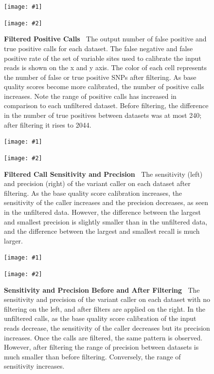 \documentclass{report}
\newcommand{\titlecaption}[2]{\caption[#1]{\textbf{#1 \textbar\,} #2}}
\newcommand{\includetwo}[2]{\begin{minipage}{.475\textwidth}%
\texttt{[image: \#1]}%
\end{minipage}\hfill\begin{minipage}{.475\textwidth}%
\texttt{[image: \#2]}%
\end{minipage}}
\begin{document}
\begin{figure}
\centering
\includetwo{flt_fp_heatmap.pdf}{flt_tp_heatmap.pdf}
\titlecaption{Filtered Positive Calls}{The output number of false positive and true positive calls for each dataset. The false negative and false positive rate of the set of variable sites used to calibrate the input reads is shown on the x and y axis. The color of each cell represents the number of false or true positive SNPs after filtering. As base quality scores become more calibrated, the number of positive calls increases. Note the range of positive calls has increased in comparison to each unfiltered dataset. Before filtering, the difference in the number of true positives between datasets was at most 240; after filtering it rises to 2044.}
\label{fig:vc_flt_p}
\end{figure}


\begin{figure}
\centering
\includetwo{flt_sensitivity.pdf}{flt_precision.pdf}
\titlecaption{Filtered Call Sensitivity and Precision}{The sensitivity (left) and precision (right) of the variant caller on each dataset after filtering. As the base quality score calibration increases, the sensitivity of the caller increases and the precision decreases, as seen in the unfiltered data. However, the difference between the largest and smallest precision is slightly smaller than in the unfiltered data, and the difference between the largest and smallest recall is much larger.}
\label{fig:vc_flt_sp}
\end{figure}

\begin{figure}
\centering
\includetwo{sens_precision.pdf}{flt_sens_precision.pdf}
\titlecaption{Sensitivity and Precision Before and After Filtering}{The sensitivity and precision of the variant caller on each dataset with no filtering on the left, and after filters are applied on the right. In the unfiltered calls, as the base quality score calibration of the input reads decrease, the sensitivity of the caller decreases but its precision increases. Once the calls are filtered, the same pattern is observed. However, after filtering the range of precision between datasets is much smaller than before filtering. Conversely, the range of sensitivity increases.}
\label{fig:vc_sens_prec}
\end{figure}
\end{document}
